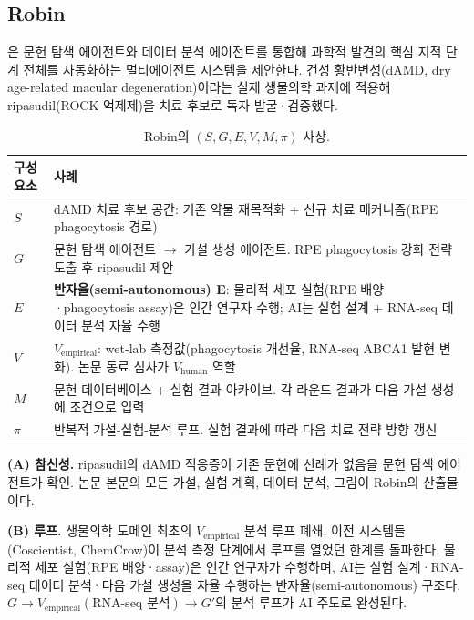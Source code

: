 \documentclass[11pt]{article}
\newcommand{\sgmvpi}{$(S, G, E, V, M, \pi)$}
\begin{document}
\subsection{Robin}
\label{sec:robin}

\citet{ghareeb2026robin}은 문헌 탐색 에이전트와 데이터 분석 에이전트를 통합해 과학적 발견의 핵심 지적 단계 전체를 자동화하는 멀티에이전트 시스템을 제안한다. 건성 황반변성(dAMD, dry age-related macular degeneration)이라는 실제 생물의학 과제에 적용해 ripasudil(ROCK 억제제)을 치료 후보로 독자 발굴·검증했다.

\begin{table}[h]
\centering
\small
\begin{tabular}{@{}lp{9cm}@{}}
\toprule
구성요소 & 사례 \\
\midrule
$S$ & dAMD 치료 후보 공간: 기존 약물 재목적화 + 신규 치료 메커니즘(RPE phagocytosis 경로) \\
$G$ & 문헌 탐색 에이전트 $\rightarrow$ 가설 생성 에이전트. RPE phagocytosis 강화 전략 도출 후 ripasudil 제안 \\
$E$ & \textbf{반자율(semi-autonomous) E}: 물리적 세포 실험(RPE 배양·phagocytosis assay)은 인간 연구자 수행; AI는 실험 설계 + RNA-seq 데이터 분석 자율 수행 \\
$V$ & $V_\text{empirical}$: wet-lab 측정값(phagocytosis 개선율, RNA-seq ABCA1 발현 변화). 논문 동료 심사가 $V_\text{human}$ 역할 \\
$M$ & 문헌 데이터베이스 + 실험 결과 아카이브. 각 라운드 결과가 다음 가설 생성에 조건으로 입력 \\
$\pi$ & 반복적 가설-실험-분석 루프. 실험 결과에 따라 다음 치료 전략 방향 갱신 \\
\bottomrule
\end{tabular}
\caption{Robin의 \sgmvpi{} 사상.}
\end{table}

\noindent\textbf{(A) 참신성.} ripasudil의 dAMD 적응증이 기존 문헌에 선례가 없음을 문헌 탐색 에이전트가 확인. 논문 본문의 모든 가설, 실험 계획, 데이터 분석, 그림이 Robin의 산출물이다.

\noindent\textbf{(B) 루프.} 생물의학 도메인 최초의 $V_\text{empirical}$ 분석 루프 폐쇄. 이전 시스템들(Coscientist, ChemCrow)이 분석 측정 단계에서 루프를 열었던 한계를 돌파한다. 물리적 세포 실험(RPE 배양·assay)은 인간 연구자가 수행하며, AI는 실험 설계·RNA-seq 데이터 분석·다음 가설 생성을 자율 수행하는 반자율(semi-autonomous) 구조다. $G \rightarrow V_\text{empirical}(\text{RNA-seq 분석}) \rightarrow G'$의 분석 루프가 AI 주도로 완성된다.
\end{document}
